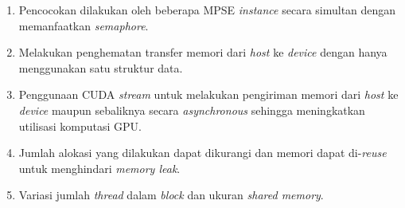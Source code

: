     \begin{enumerate}

        \item
        Pencocokan dilakukan oleh beberapa MPSE \emph{instance} secara simultan dengan memanfaatkan \emph{semaphore}.

        \item
        Melakukan penghematan transfer memori dari \emph{host} ke \emph{device} dengan hanya menggunakan satu struktur data.

        \item
        Penggunaan CUDA \emph{stream} untuk melakukan pengiriman memori dari \emph{host} ke \emph{device} maupun sebaliknya secara \emph{asynchronous} sehingga meningkatkan utilisasi komputasi GPU.

        \item
        Jumlah alokasi yang dilakukan dapat dikurangi dan memori dapat di-\emph{reuse} untuk menghindari \emph{memory leak}.

        \item
        Variasi jumlah \emph{thread} dalam \emph{block} dan ukuran \emph{shared memory}.
        
    \end{enumerate}